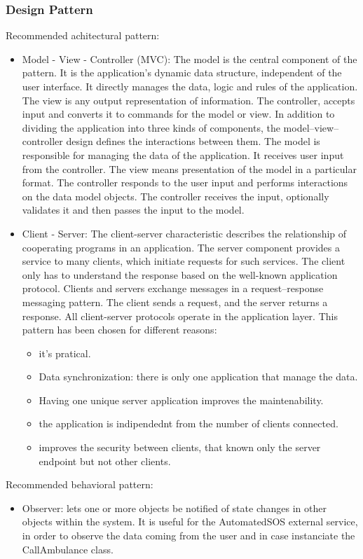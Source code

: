 \documentclass{article}
\begin{document}
\subsubsection{Design Pattern}
Recommended achitectural pattern:
\begin{itemize}
\item Model - View - Controller (MVC): The model is the central component of the pattern. It is the application's dynamic data structure, independent of the user interface. It directly manages the data, logic and rules of the application. The view is any output representation of information. The controller, accepts input and converts it to commands for the model or view.
In addition to dividing the application into three kinds of components, the model–view–controller design defines the interactions between them.
The model is responsible for managing the data of the application. It receives user input from the controller. The view means presentation of the model in a particular format. The controller responds to the user input and performs interactions on the data model objects. The controller receives the input, optionally validates it and then passes the input to the model.
\item Client - Server: The client-server characteristic describes the relationship of cooperating programs in an application. The server component provides a service to many clients, which initiate requests for such services. The client only has to understand the response based on the well-known application protocol. Clients and servers exchange messages in a request–response messaging pattern. The client sends a request, and the server returns a response. All client-server protocols operate in the application layer. This pattern has been chosen for different reasons:
\begin{itemize}
\item it’s pratical.
\item Data synchronization: there is only one application that manage the data.
\item Having one unique server application improves the maintenability.
\item the application is indipendednt from the number of clients connected.
\item improves the security between clients, that known only the server endpoint
but not other clients.
\end{itemize}
\end{itemize}
Recommended behavioral pattern:
\begin{itemize}
\item Observer: lets one or more objects be notified of state changes in other objects within the system. It is useful for the AutomatedSOS external service, in order to observe the data coming from the user and in case instanciate the CallAmbulance class.
\end{itemize}
\end{document}
